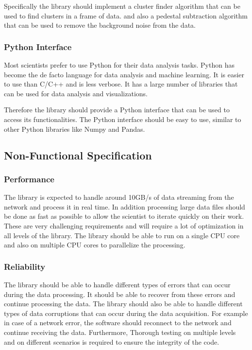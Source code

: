 \begin{spacing}{1.2}
    Specifically the library should implement a cluster finder algorithm that can be used to find clusters in a frame of data.
    and also a pedestal subtraction algorithm that can be used to remove the background noise from the data.

    \subsubsection{Python Interface}

    Most scientists prefer to use Python for their data analysis tasks. Python has
    become the de facto language for data analysis and machine learning.
    It is easier to use than C/C++ and is less verbose. It has a large number of libraries
    that can be used for data analysis and visualizations.

    Therefore the library should provide a Python interface that can be used to access its functionalities.
    The Python interface should be easy to use, similar to other Python libraries like Numpy and Pandas.


    \subsection{Non-Functional Specification}
    \subsubsection{Performance}
    The library is expected to handle around 10GB/s of data streaming from the network and process it in real time.
    In addition processing large data files should be done as fast as possible to allow the scientist to iterate quickly on their work.
    These are very challenging requirements and will require a lot of optimization in all levels of the library.
    The library should be able to run on a single CPU core and also on multiple CPU cores to parallelize the processing.

    \subsubsection{Reliability}
    The library should be able to handle different types of errors that can occur during the data processing.
    It should be able to recover from these errors and continue processing the data.
    The library should also be able to handle different types of data corruptions that can occur during the data acquisition.
    For example in case of a network error, the software should reconnect to the network and continue receiving the data.
    Furthermore, Thorough testing on multiple levels and on different scenarios is required to ensure the integrity of the code.


\end{spacing}
